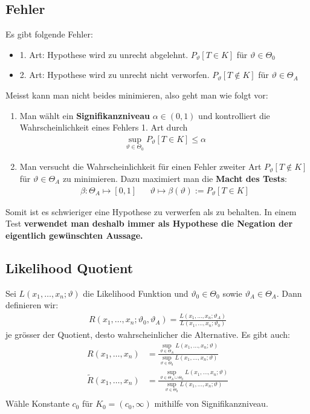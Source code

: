 \documentclass[8pt]{extarticle}
\newcommand{\vt}{\vartheta}
\begin{document}
\begin{multicols*}{3}
  \subsection*{Fehler}
  Es gibt folgende Fehler:
  \begin{itemize}
    \item 1. Art: Hypothese wird zu unrecht abgelehnt. $P_\vt[T \in K]$ für $\vt \in \varTheta_0$
    \item 2. Art: Hypothese wird zu unrecht nicht verworfen. $P_\vt[T \not \in K]$ für $\vt \in \varTheta_A$
  \end{itemize}
  Meisst kann man nicht beides minimieren, also geht man wie folgt vor:
  \begin{enumerate}
    \item Man wählt ein \textbf{Signifikanzniveau} $\alpha \in (0, 1)$ und kontrolliert
          die Wahrscheinlichkeit eines Fehlers 1. Art durch
          \begin{align*}
            \sup_{\vt \in \varTheta_0} P_\vt[T \in K] \leq \alpha
          \end{align*}
    \item Man versucht die Wahrscheinlichkeit für einen Fehler zweiter Art
          $P_\vt[T \not \in K]$ für $\vt \in \varTheta_A$ zu minimieren. Dazu maximiert
          man die \textbf{Macht des Tests}:
          \begin{align*}
            \beta : \varTheta_A \mapsto [0, 1] &  & \vt \mapsto \beta(\vt) := P_\vt[T \in K]
          \end{align*}
  \end{enumerate}
  Somit ist es schwieriger eine Hypothese zu verwerfen als zu behalten. In einem
  Test \textbf{verwendet man deshalb immer als Hypothese die Negation der eigentlich gewünschten Aussage.}
  \subsection*{Likelihood Quotient}
  Sei $L(x_1, \dots, x_n; \vt)$ die Likelihood Funktion und $\vt_0 \in \varTheta_0$
  sowie $\vt_A \in \varTheta_A$. Dann definieren wir:
  \begin{align*}
    R(x_1, \dots, x_n; \vt_0, \vt_A) = \frac{L(x_1, \dots, x_n; \vt_A)}{L(x_1, \dots, x_n; \vt_0)}
  \end{align*}
  je grösser der Quotient, desto wahrscheinlicher die Alternative. Es gibt auch:
  \begin{align*}
    R(x_1, \dots, x_n)             & = \frac{ \sup_{\vt \in \varTheta_A} L(x_1, \dots, x_n; \vt)}{\sup_{\vt \in \varTheta_0} L(x_1, \dots, x_n; \vt)}                  \\
    \widetilde{R}(x_1, \dots, x_n) & = \frac{ \sup_{\vt \in \varTheta_A \cup \varTheta_0} L(x_1, \dots, x_n; \vt)}{\sup_{\vt \in \varTheta_0} L(x_1, \dots, x_n; \vt)} \\
  \end{align*}
  Wähle Konstante $c_0$ für $K_0 = (c_0, \infty)$ mithilfe von Signifikanzniveau.

\end{multicols*}
\end{document}
